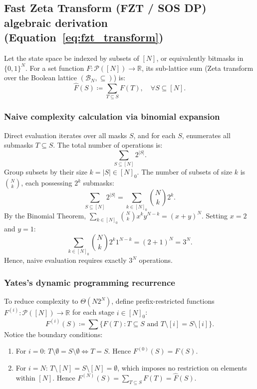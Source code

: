 \documentclass[11pt, letterpaper]{article}
\begin{document}
\subsection{Fast Zeta Transform (FZT / SOS DP) algebraic derivation (\texorpdfstring{Equation~\ref{eq:fzt_transform}}{Eq. 5})}
Let the state space be indexed by subsets of $[N]$, or equivalently bitmasks in $\{0, 1\}^N$. For a set function $F: \mathcal{P}([N]) \to \mathbb{R}$, its sub-lattice sum (Zeta transform over the Boolean lattice $(\mathcal{B}_N, \subseteq)$) is:
\begin{equation}
    \hat{F}(S) \coloneqq \sum_{T \subseteq S} F(T), \quad \forall S \subseteq [N].
\end{equation}

\subsubsection*{Naive complexity calculation via binomial expansion}
Direct evaluation iterates over all masks $S$, and for each $S$, enumerates all submasks $T \subseteq S$. The total number of operations is:
\begin{equation}
    \sum_{S \subseteq [N]} 2^{|S|}.
\end{equation}
Group subsets by their size $k = |S| \in [N]_0$. The number of subsets of size $k$ is $\binom{N}{k}$, each possessing $2^k$ submasks:
\begin{equation}
    \sum_{S \subseteq [N]} 2^{|S|} = \sum_{k \in [N]_0} \binom{N}{k} 2^k.
\end{equation}
By the Binomial Theorem, $\sum_{k \in [N]_0} \binom{N}{k} x^k y^{N-k} = (x + y)^N$. Setting $x = 2$ and $y = 1$:
\begin{equation}
    \sum_{k \in [N]_0} \binom{N}{k} 2^k 1^{N-k} = (2 + 1)^N = 3^N.
\end{equation}
Hence, naive evaluation requires exactly $3^N$ operations.

\subsubsection*{Yates's dynamic programming recurrence}
To reduce complexity to $\Theta(N 2^N)$, define prefix-restricted functions $F^{(i)}: \mathcal{P}([N]) \to \mathbb{R}$ for each stage $i \in [N]_0$:
\begin{equation}
    F^{(i)}(S) \coloneqq \sum \{F(T) : T \subseteq S \text{ and } T \setminus [i] = S \setminus [i]\}.
\end{equation}
Notice the boundary conditions:
\begin{enumerate}
    \item For $i = 0$: $T \setminus \emptyset = S \setminus \emptyset \iff T = S$. Hence $F^{(0)}(S) = F(S)$.
    \item For $i = N$: $T \setminus [N] = S \setminus [N] = \emptyset$, which imposes no restriction on elements within $[N]$. Hence $F^{(N)}(S) = \sum_{T \subseteq S} F(T) = \hat{F}(S)$.
\end{enumerate}
\end{document}
